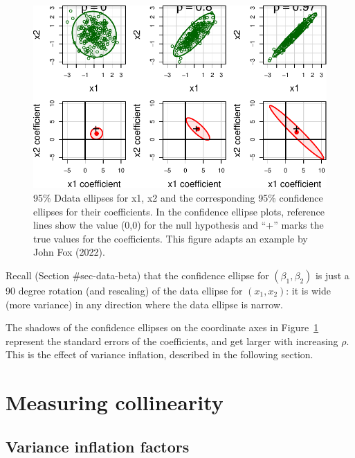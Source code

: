 \documentclass[
  letterpaper,
  10pt,
  krantz2]{krantz}
\begin{document}
\begin{figure}[H]

{\centering \includegraphics[width=1\textwidth,height=\textheight]{figs/fig-collin-data-beta-1.pdf}

}

\caption{\label{fig-collin-data-beta}95\% Ddata ellipses for x1, x2 and
the corresponding 95\% confidence ellipses for their coefficients. In
the confidence ellipse plots, reference lines show the value (0,0) for
the null hypothesis and ``+'' marks the true values for the
coefficients. This figure adapts an example by John Fox (2022).}

\end{figure}

Recall (Section \#sec-data-beta) that the confidence ellipse for
\((\beta_1, \beta_2)\) is just a 90 degree rotation (and rescaling) of
the data ellipse for \((x_1, x_2)\): it is wide (more variance) in any
direction where the data ellipse is narrow.

The shadows of the confidence ellipses on the coordinate axes in
Figure~\ref{fig-collin-data-beta} represent the standard errors of the
coefficients, and get larger with increasing \(\rho\). This is the
effect of variance inflation, described in the following section.

\hypertarget{sec-measure-collin}{%
\section{Measuring collinearity}\label{sec-measure-collin}}

\hypertarget{sec-vif}{%
\subsection{Variance inflation factors}\label{sec-vif}}
\end{document}
